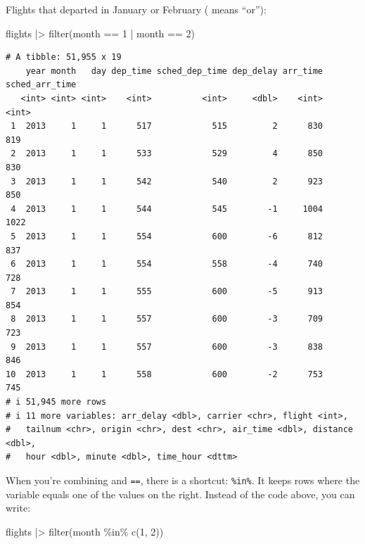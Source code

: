 \documentclass[
  letterpaper,
  DIV=11,
  numbers=noendperiod]{scrreprt}
\newenvironment{Shaded}{\begin{snugshade}}{\end{snugshade}}
\newcommand{\DecValTok}[1]{\textcolor[rgb]{0.68,0.00,0.00}{#1}}
\newcommand{\FunctionTok}[1]{\textcolor[rgb]{0.28,0.35,0.67}{#1}}
\newcommand{\NormalTok}[1]{\textcolor[rgb]{0.00,0.23,0.31}{#1}}
\newcommand{\SpecialCharTok}[1]{\textcolor[rgb]{0.37,0.37,0.37}{#1}}
\begin{document}
Flights that departed in January or February (\texttt{\textbar{}} means
``or''):

\begin{Shaded}
\begin{Highlighting}[]
\NormalTok{flights }\SpecialCharTok{|\textgreater{}}
  \FunctionTok{filter}\NormalTok{(month }\SpecialCharTok{==} \DecValTok{1} \SpecialCharTok{|}\NormalTok{ month }\SpecialCharTok{==} \DecValTok{2}\NormalTok{)}
\end{Highlighting}
\end{Shaded}

\begin{verbatim}
# A tibble: 51,955 x 19
    year month   day dep_time sched_dep_time dep_delay arr_time sched_arr_time
   <int> <int> <int>    <int>          <int>     <dbl>    <int>          <int>
 1  2013     1     1      517            515         2      830            819
 2  2013     1     1      533            529         4      850            830
 3  2013     1     1      542            540         2      923            850
 4  2013     1     1      544            545        -1     1004           1022
 5  2013     1     1      554            600        -6      812            837
 6  2013     1     1      554            558        -4      740            728
 7  2013     1     1      555            600        -5      913            854
 8  2013     1     1      557            600        -3      709            723
 9  2013     1     1      557            600        -3      838            846
10  2013     1     1      558            600        -2      753            745
# i 51,945 more rows
# i 11 more variables: arr_delay <dbl>, carrier <chr>, flight <int>,
#   tailnum <chr>, origin <chr>, dest <chr>, air_time <dbl>, distance <dbl>,
#   hour <dbl>, minute <dbl>, time_hour <dttm>
\end{verbatim}

When you're combining \texttt{\textbar{}} and \texttt{==}, there is a
shortcut: \texttt{\%in\%}. It keeps rows where the variable equals one
of the values on the right. Instead of the code above, you can write:

\begin{Shaded}
\begin{Highlighting}[]
\NormalTok{flights }\SpecialCharTok{|\textgreater{}}
  \FunctionTok{filter}\NormalTok{(month }\SpecialCharTok{\%in\%} \FunctionTok{c}\NormalTok{(}\DecValTok{1}\NormalTok{, }\DecValTok{2}\NormalTok{))}
\end{Highlighting}
\end{Shaded}
\end{document}
